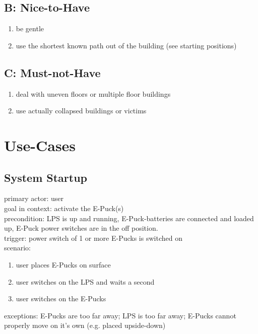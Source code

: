 \documentclass[a4paper,parskip,headheight=38pt]{scrartcl} %
\begin{document}
\subsection*{B: Nice-to-Have}
\begin{enumerate}[label=\nicetohave]
\item be gentle
\item use the shortest known path out of the building (see starting positions)
\end{enumerate}

\subsection*{C: Must-not-Have}
\begin{enumerate}[label=\mustnothave]
\item deal with uneven floors or multiple floor buildings
\item use actually collapsed buildings or victims
\end{enumerate}


\section{Use-Cases}
\subsection{System Startup}
primary actor: user \\
goal in context: activate the E-Puck(s) \\
precondition: LPS is up and running, E-Puck-batteries are connected and loaded up, E-Puck power switches are in the off position. \\
trigger: power switch of 1 or more E-Pucks is switched on \\
scenario: 
\begin{enumerate}[label={\arabic*.}]
	\item user places E-Pucks on surface 
	\item user switches on the LPS and waits a second 
	\item user switches on the E-Pucks 
\end{enumerate}
exceptions: E-Pucks are too far away; LPS is too far away; E-Pucks cannot properly move on it's own (e.g. placed upside-down) \\
\end{document}
